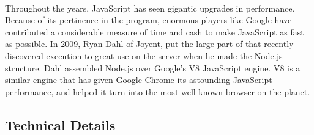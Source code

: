 \documentclass[../thesis.tex]{subfiles}
\begin{document}
\paragraph{}

Throughout the years, JavaScript has seen gigantic upgrades in performance. Because of its pertinence in the program, enormous players like Google have contributed a considerable measure of time and cash to make JavaScript as fast as possible. In 2009, Ryan Dahl of Joyent, put the large part of that recently discovered execution to great use on the server when he made the Node.js structure. Dahl assembled Node.js over Google's V8 JavaScript engine. V8 is a similar engine that has given Google Chrome its astounding JavaScript performance, and helped it turn into the most well-known browser on the planet.
\newpage
\subsection*{Technical Details}
\end{document}
